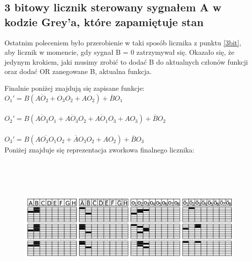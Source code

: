 \documentclass[a4paper,12pt]{article}
\begin{document}
\begin{justify}
\subsection{3 bitowy licznik sterowany sygnałem A w kodzie Grey'a, które zapamiętuje stan}

Ostatnim poleceniem było przerobienie w taki sposób licznika z punktu \ref{3bit}, aby licznik w momencie, gdy sygnał B = 0 zatrzymywał się.
Okazało się, że jedynym krokiem, jaki musimy zrobić to dodać  B do aktualnych członów funkcji oraz dodać OR zanegowane B, aktualna funkcja.

Finalnie poniżej znajdują się zapisane funkcje: \\
$O_{1}' = B(\overline{AO_{2}} + O_{3}O_{2} + AO_{2}) + \overline{B}O_{1}$ \\ \, \\
$O_{2}' = B(\overline{AO_{3}}O_{1} + \overline{AO_{3}}O_{2} + \overline{AO_{1}}O_{3} + AO_{3}) + \overline{B}O_{2}$ \\ \, \\
$O_{3}' = B(\overline{AO_{3}O_{1}}O_{2} + \overline{A}O_{3}O_{2} + AO_{2}) + \overline{B}O_{3}$ \\

Poniżej znajduje się reprezentacja zworkowa finalnego licznika:

\begin{figure}[h!]
\centering
\includegraphics[width=18cm, height=7cm]{licznik_grey_B}
\end{figure}

\end{justify}
\end{document}

